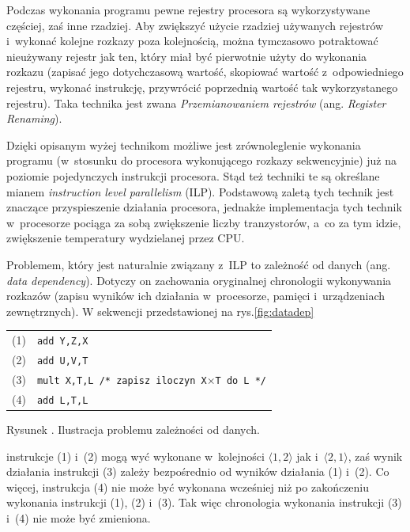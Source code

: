 \documentclass[12pt,makeidx]{mwart}
\newcounter{figmain}
\newcommand{\myfigcounter}[1]{ \begin{center}Rysunek \arabic{figmain}. #1.\end{center} \addtocounter{figmain}{1} }
\begin{document}
\par
%
\indent
	Podczas wykonania programu pewne rejestry procesora są wykorzystywane częściej, zaś inne rzadziej. Aby zwiększyć użycie rzadziej
	używanych rejestrów i~wykonać kolejne rozkazy poza kolejnością, można tymczasowo potraktować nieużywany rejestr jak ten, który miał
	być pierwotnie użyty do wykonania rozkazu (zapisać jego dotychczasową wartość, skopiować wartość z~odpowiedniego rejestru, wykonać instrukcję,
	przywrócić poprzednią wartość tak wykorzystanego rejestru). Taka technika jest zwana 
	\emph{Przemianowaniem rejestrów} (ang. \emph{Register Renaming}).
\par
%
\indent
	Dzięki opisanym wyżej technikom możliwe jest zrównoleglenie wykonania programu (w~stosunku do procesora wykonującego rozkazy sekwencyjnie)
	już na poziomie pojedynczych instrukcji procesora. Stąd też techniki te są określane mianem \emph{instruction level parallelism} (ILP).
	Podstawową zaletą tych technik jest znaczące przyspieszenie działania procesora, jednakże implementacja tych technik w~procesorze pociąga za
	sobą zwiększenie liczby tranzystorów, a~co za tym idzie, zwiększenie temperatury wydzielanej przez CPU.
\par
%
\indent
	Problemem, który jest naturalnie związany z~ILP to zależność od danych (ang. \emph{data dependency}).
	Dotyczy on zachowania oryginalnej chronologii wykonywania rozkazów (zapisu wyników
	ich działania w~procesorze, pamięci i~urządzeniach zewnętrznych). W sekwencji przedstawionej na rys.\ref{fig:datadep}
	\begin{center}
	\begin{tabular}{l l}\\
		(1) & {\tt add Y,Z,X} \\
		(2) & {\tt add U,V,T} \\
		(3) & {\tt mult X,T,L /* zapisz iloczyn X}$\times${\tt T do L */} \\
		(4) & {\tt add L,T,L} \\
	\end{tabular}
	\myfigcounter{Ilustracja problemu zależności od danych}
	\label{fig:datadep}
	\end{center}
	instrukcje (1) i~(2) mogą wyć wykonane w~kolejności $\langle 1,2 \rangle$ jak i~$\langle 2,1 \rangle$, zaś wynik działania instrukcji
	(3) zależy bezpośrednio od wyników działania (1) i~(2). Co więcej, instrukcja (4) nie może być wykonana wcześniej 
	niż po zakończeniu wykonania instrukcji (1), (2) i~(3). Tak więc chronologia wykonania instrukcji (3) i~(4) nie może być zmieniona.
\par
\end{document}
